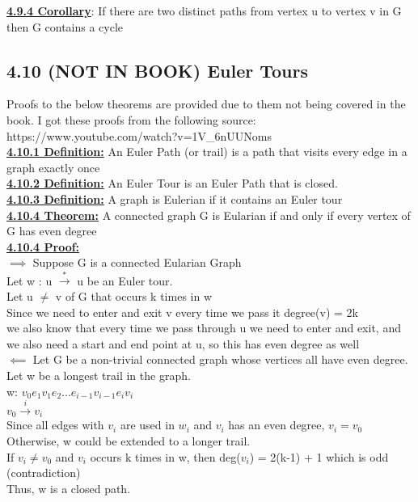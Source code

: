 \documentclass[12pt]{article}
\newcommand{\myt}[1]{\textbf{\underline{#1}}}
\begin{document}
	\myt{4.9.4 Corollary}: If there are two distinct paths from vertex u to vertex v in G then G contains a cycle\\
	
	\subsection*{4.10 (NOT IN BOOK) Euler Tours}
	Proofs to the below theorems are provided due to them not being covered in the book. I got these proofs from the following source:\\
	https://www.youtube.com/watch?v=1V\_6nUUNoms \\
	
	\myt{4.10.1 Definition:} An Euler Path (or trail) is a path that visits every edge in a graph exactly once\\
	\myt{4.10.2 Definition:} An Euler Tour is an Euler Path that is closed.\\
	\myt{4.10.3 Definition:} A graph is Eulerian if it contains an Euler tour\\
	
	\myt{4.10.4 Theorem:} A connected graph G is Eularian if and only if every vertex of G has even degree\\
	\myt{4.10.4 Proof:}\\
	$\implies$ Suppose G is a connected Eularian Graph\\
	Let w : u $\overset{*}{\rightarrow}$ u be an Euler tour.\\
	Let u $\neq$ v of G that occurs k times in w\\
	Since we need to enter and exit v every time we pass it degree(v) = 2k\\
	we also know that every time we pass through u we need to enter and exit, and we also need a start and end point at u, so this has even degree as well\\
	
	$\impliedby$ Let G be a non-trivial connected graph whose vertices all have even degree.\\
	
	Let w be a longest trail in the graph.\\
	w: $v_0e_1v_1e_2 ... e_{i-1}v_{i-1}e_iv_i$\\
	$v_0 \overset{i}{\rightarrow} v_i$\\
	
	Since all edges with $v_i$ are used in $w_i$ and $v_i$ has an even degree, $v_i = v_0$\\
	Otherwise, w could be extended to a longer trail.\\
	If $v_i \neq v_0$ and $v_i$ occurs k times in w, then deg($v_i$) = 2(k-1) + 1 which is odd (contradiction)\\
	Thus, w is a closed path.
	
\end{document}
